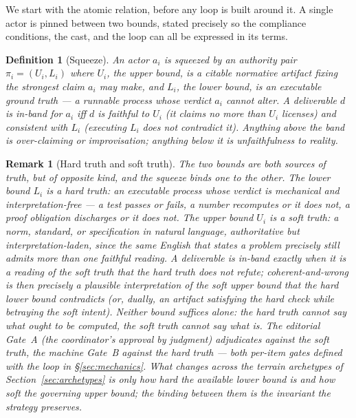 \documentclass[11pt]{article}
\newtheorem{definition}{Definition}
\newtheorem{remark}{Remark}
\begin{document}
We start with the atomic relation, before any loop is built around it. A single actor
is pinned between two bounds, stated precisely so the compliance conditions, the cast,
and the loop can all be expressed in its terms.

\begin{definition}[Squeeze]
\label{def:squeeze}
An actor $a_i$ is \emph{squeezed} by an authority pair
$\pi_i = (U_i, L_i)$ where $U_i$, the \emph{upper bound}, is a citable
normative artifact fixing the strongest claim $a_i$ may make, and $L_i$, the
\emph{lower bound}, is an executable ground truth --- a runnable process whose
verdict $a_i$ cannot alter. A deliverable $d$ is \emph{in-band} for $a_i$ iff
$d$ is faithful to $U_i$ (it claims no more than $U_i$ licenses) and
consistent with $L_i$ (executing $L_i$ does not contradict it). Anything above
the band is over-claiming or improvisation; anything below it is
unfaithfulness to reality.
\end{definition}

\begin{remark}[Hard truth and soft truth]
The two bounds are both sources of truth, but of opposite \emph{kind}, and the squeeze binds one
to the other. The lower bound $L_i$ is a \emph{hard} truth: an executable process whose verdict
is mechanical and interpretation-free --- a test passes or fails, a number recomputes or it does
not, a proof obligation discharges or it does not. The upper bound $U_i$ is a \emph{soft} truth:
a norm, standard, or specification in natural language, authoritative but interpretation-laden,
since the same English that states a problem precisely still admits more than one faithful
reading. A deliverable is in-band exactly when it is a reading of the soft truth that the hard
truth does not refute; \emph{coherent-and-wrong} is then precisely a plausible interpretation of
the soft upper bound that the hard lower bound contradicts (or, dually, an artifact satisfying
the hard check while betraying the soft intent). Neither bound suffices alone: the hard truth
cannot say what \emph{ought} to be computed, the soft truth cannot say what \emph{is}. The
editorial \emph{Gate~A} (the coordinator's approval by judgment) adjudicates against the soft
truth, the machine \emph{Gate~B} against the hard truth --- both per-item gates defined with the
loop in \S\ref{sec:mechanics}. What changes across the terrain archetypes of
Section~\ref{sec:archetypes} is only \emph{how hard} the available lower bound is and \emph{how
soft} the governing upper bound; the binding between them is the invariant the strategy
preserves.
\end{remark}
\end{document}

